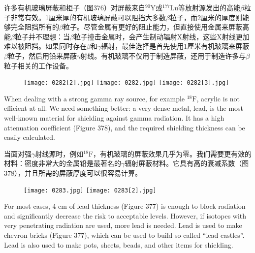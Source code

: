 \documentclass[dvipsnames, svgnames,a4paper,11pt]{article}
\begin{document}
许多有机玻璃屏蔽和柜子（图376）对屏蔽来自\(\mathrm{^{90}Y}\)或\(\mathrm{^{177}Lu}\)等放射源发出的高能$\beta$粒子非常有效。1厘米厚的有机玻璃屏蔽可以阻挡大多数$\beta$粒子，而2厘米的厚度则能够完全阻挡所有的$\beta$粒子。尽管金属有更好的阻止能力，但直接使用金属来屏蔽高能$\beta$粒子并不理想：当$\beta$粒子撞击金属时，会产生制动辐射X射线，这些X射线更加难以被阻挡。如果同时存在$\beta$和$\gamma$辐射，最佳选择是首先使用1厘米有机玻璃来屏蔽$\beta$粒子，然后用铅来屏蔽$\gamma$射线。有机玻璃不仅用于制造屏蔽，还用于制造许多与$\beta$粒子相关的工作设备。

\begin{figure}[h]
    \centering
    \texttt{[image: 0282[2].jpg]} \hspace{0.1in}
    \texttt{[image: 0282.jpg]} \hspace{0.1in}
    \texttt{[image: 0282[3].jpg]}  
     \label{fig376}
\end{figure}

When dealing with a strong gamma ray source, for example \(\mathrm{^{18}F}\), acrylic is not efficient at all. We need something better: a very dense metal, lead, is the most well-known material for shielding against gamma radiation. It has a high attenuation coefficient (Figure 378), and the required shielding thickness can be easily calculated.

当面对强$\gamma$射线源时，例如\(\mathrm{^{18}F}\)，有机玻璃的屏蔽效果几乎为零。我们需要更有效的材料：密度非常大的金属铅是最著名的$\gamma$辐射屏蔽材料。它具有高的衰减系数（图378），并且所需的屏蔽厚度可以很容易计算。

\begin{figure}[h]
    \centering
    \texttt{[image: 0283.jpg]} \hspace{0.1in}
    \texttt{[image: 0283[2].jpg]} \hspace{0.1in}
     \label{fig377}
\end{figure}

For most cases, 4 cm of lead thickness (Figure 377) is enough to block radiation and significantly decrease the risk to acceptable levels. However, if isotopes with very penetrating radiation are used, more lead is needed. Lead is used to make chevron bricks (Figure 377), which can be used to build so-called “lead castles”. Lead is also used to make pots, sheets, beads, and other items for shielding.
\end{document}

